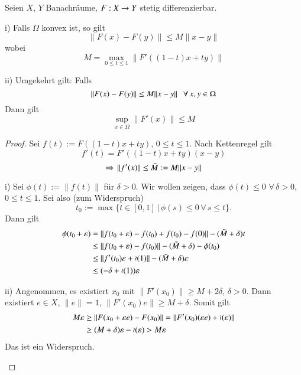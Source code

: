 \begin{theorem}[Mittelwert]\label{1.15}
    Seien $X$, $Y$ Banachräume, $F:X\rightarrow Y$ stetig differenzierbar.
    \begin{description}
    \item{i)}
    Falls $\Omega$ konvex ist, so gilt
    \[
        \|F(x)-F(y)\|\leq M\|x-y\|
    \]
    wobei
    \[
        M=\max_{0\leq t \leq 1}\| F'((1-t)x + ty) \|
    \]
    \item{ii)}
    Umgekehrt gilt: Falls
    \[
        \| F(x)-F(y) \|\leq M\|x-y\| \hspace{.25cm} \forall \, x,y\in \Omega
    \]
    Dann gilt
    \[
        \sup_{x\in \Omega}\|F'(x)\|\leq M
    \]
    \end{description}
\end{theorem}

\begin{proof}
    Sei $f(t):= F((1-t)x+ty)$, $0\leq t\leq1$. Nach Kettenregel gilt
    \[
        f'(t)=F'((1-t)x+ty)(x-y)  
    \]
    \[
        \Rightarrow \, \|f'(x)\|\leq\tilde M:= M\|x-y\|  
    \]
    \begin{description}
    \item{i)}
    Sei $\phi(t):=\|f(t)\|$ für $\delta>0$. Wir wollen zeigen, dass $\phi(t)\leq0$ $\forall \, 
    \delta>0$, $0\leq t\leq1$. Sei also (zum Widerspruch)
    \[
        t_0:=\max\{t\in [0,1]\, | \, \phi(s)\leq 0 \, \forall \, s\leq t\}.
    \]
    Dann gilt
    \begin{align*}
        \phi(t_0+\varepsilon)&=\|f(t_0+\varepsilon)-f(t_0)+f(t_0)-f(0)\|-(\tilde M + \delta)t\\
        &\leq \|f(t_0+\varepsilon)-f(t_0)\|-(\tilde M +\delta) -\phi(t_0)\\
        &\leq \|f'(t_0)\varepsilon+ \mathcal o (1)\|-(\tilde M +\delta)\varepsilon\\
        &\leq (-\delta + \mathcal o (1))\varepsilon 
    \end{align*}
    \item{ii)}
    Angenommen, es existiert $x_0$ mit $\|F'(x_0)\|\geq M+2\delta$, $\delta>0$. Dann existiert
    $e\in X$, $\|e\|=1$, $\| F'(x_0)e \|\geq M+\delta$. Somit gilt
    \begin{align*}
        M\varepsilon&\geq \|F(x_0+\varepsilon e) - F(x_0)\|= \|F'(x_0)(\varepsilon e)+\mathcal o (\varepsilon)\|\\
         &\geq (M+\delta)\varepsilon- \mathcal o(\varepsilon) > M\varepsilon
    \end{align*}
    Das ist ein Widerspruch.
    \end{description}
    \[\]
\end{proof}


